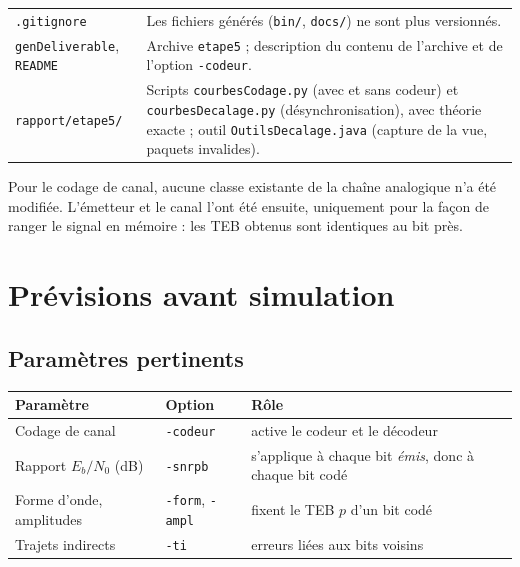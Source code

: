 \documentclass[11pt,a4paper]{article}
\newcommand{\EbNo}{E_b/N_0}
\begin{document}
\begin{center}
\begin{tabularx}{\linewidth}{>{\raggedright\arraybackslash}p{4.2cm}X}
\texttt{.gitignore} & Les fichiers générés (\texttt{bin/}, \texttt{docs/}) ne sont plus versionnés.\\
\texttt{genDeliverable}, \texttt{README} & Archive \texttt{etape5} ; description du contenu de l'archive et de l'option \texttt{-codeur}.\\
\texttt{rapport/etape5/} & Scripts \texttt{courbesCodage.py} (avec et sans codeur) et \texttt{courbesDecalage.py} (désynchronisation), avec théorie exacte ; outil \texttt{OutilsDecalage.java} (capture de la vue, paquets invalides).\\\bottomrule
\end{tabularx}\end{center}
Pour le codage de canal, aucune classe existante de la chaîne analogique n'a été modifiée. L'émetteur et le canal l'ont été ensuite, uniquement pour la façon de ranger le signal en mémoire : les TEB obtenus sont identiques au bit près.

\section{Prévisions avant simulation}
\subsection{Paramètres pertinents}
\begin{center}\begin{tabular}{lll}\toprule
Paramètre & Option & Rôle\\\midrule
Codage de canal & \texttt{-codeur} & active le codeur et le décodeur\\
Rapport $\EbNo$ (dB) & \texttt{-snrpb} & s'applique à chaque bit \emph{émis}, donc à chaque bit codé\\
Forme d'onde, amplitudes & \texttt{-form}, \texttt{-ampl} & fixent le TEB $p$ d'un bit codé\\
Trajets indirects & \texttt{-ti} & erreurs liées aux bits voisins\\\bottomrule
\end{tabular}\end{center}
\end{document}
